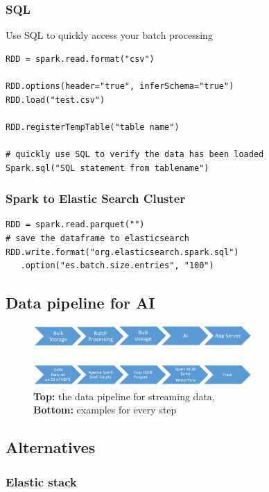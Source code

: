 \documentclass{article}
\begin{document}
\subsubsection{SQL}

Use SQL to quickly access your batch processing

\begin{verbatim}
RDD = spark.read.format("csv")

RDD.options(header="true", inferSchema="true")
RDD.load("test.csv")

RDD.registerTempTable("table name")

# quickly use SQL to verify the data has been loaded
Spark.sql("SQL statement from tablename")
\end{verbatim}

\subsubsection{Spark to Elastic Search Cluster}

\begin{verbatim}
RDD = spark.read.parquet("")
# save the dataframe to elasticsearch
RDD.write.format("org.elasticsearch.spark.sql")
   .option("es.batch.size.entries", "100")
\end{verbatim}

\subsection{Data pipeline for AI}

\begin{figure}[H]
    \centering
    \includegraphics[width=0.75\textwidth]{datapipeline-ai.png}
    \caption{\textbf{Top:} the data pipeline for streaming data,\\ \textbf{Bottom:} examples for every step}
\end{figure}

\subsection{Alternatives}

\subsubsection{Elastic stack}
\end{document}
